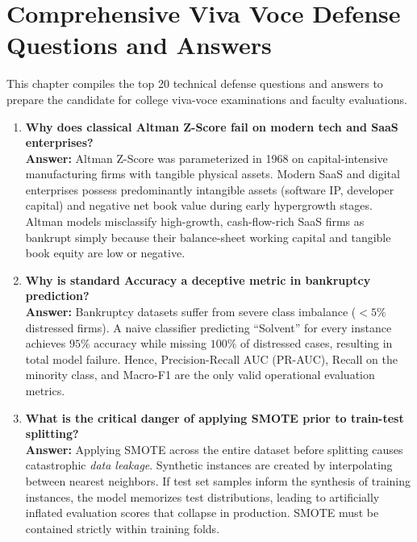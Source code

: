 \documentclass[11pt, a4paper]{article}
\begin{document}
\clearpage

\section{Comprehensive Viva Voce Defense Questions and Answers}

This chapter compiles the top 20 technical defense questions and answers to prepare the candidate for college viva-voce examinations and faculty evaluations.

\begin{enumerate}
    \item \textbf{Why does classical Altman Z-Score fail on modern tech and SaaS enterprises?}\\
    \textbf{Answer:} Altman Z-Score was parameterized in 1968 on capital-intensive manufacturing firms with tangible physical assets. Modern SaaS and digital enterprises possess predominantly intangible assets (software IP, developer capital) and negative net book value during early hypergrowth stages. Altman models misclassify high-growth, cash-flow-rich SaaS firms as bankrupt simply because their balance-sheet working capital and tangible book equity are low or negative.
    
    \item \textbf{Why is standard Accuracy a deceptive metric in bankruptcy prediction?}\\
    \textbf{Answer:} Bankruptcy datasets suffer from severe class imbalance ($< 5\%$ distressed firms). A naive classifier predicting ``Solvent'' for every instance achieves $95\%$ accuracy while missing $100\%$ of distressed cases, resulting in total model failure. Hence, Precision-Recall AUC (PR-AUC), Recall on the minority class, and Macro-F1 are the only valid operational evaluation metrics.
    
    \item \textbf{What is the critical danger of applying SMOTE prior to train-test splitting?}\\
    \textbf{Answer:} Applying SMOTE across the entire dataset before splitting causes catastrophic \textit{data leakage}. Synthetic instances are created by interpolating between nearest neighbors. If test set samples inform the synthesis of training instances, the model memorizes test distributions, leading to artificially inflated evaluation scores that collapse in production. SMOTE must be contained strictly within training folds.
    

\end{enumerate}
\end{document}
